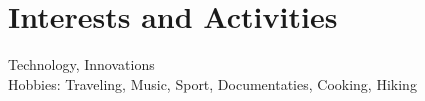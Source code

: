 \documentclass[a4paper,10pt]{article} %
\begin{document}

\section{Interests and Activities}

Technology, Innovations \\
Hobbies: Traveling, Music, Sport, Documentaties, Cooking, Hiking

\end{document}
